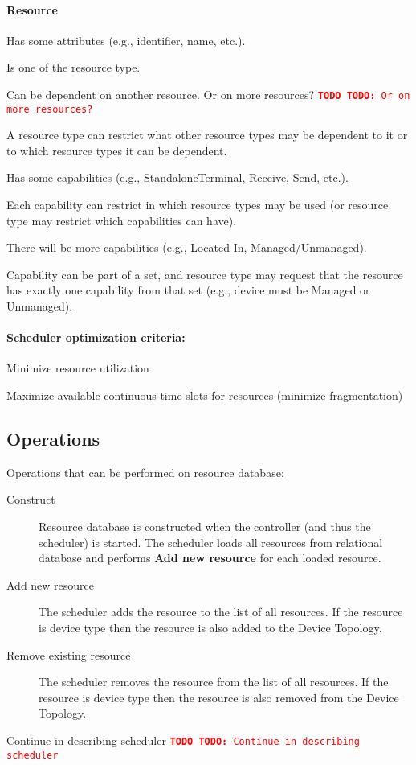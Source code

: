 \documentclass[a4paper]{report}
\newcommand{\TODO}[1]{%
\def\empty{}%
\def\prvniparametr{#1}%
\ifx\prvniparametr\empty%
\begingroup\tt\textcolor{red}{\noindent\textbf{TODO}}\endgroup
\else%
\begingroup\tt\textcolor{red}{\noindent\textbf{TODO:}\ #1}\endgroup
\fi%
}
\begin{document}
\paragraph{Resource}
\begin{compactitem}
\item Has some attributes (e.g., identifier, name, etc.).
\item Is one of the resource type.
\item Can be dependent on another resource. \TODO{Or on more resources?}
\item A resource type can restrict what other resource types may be dependent to it or to which resource types it can be dependent.
\item Has some capabilities (e.g., StandaloneTerminal, Receive, Send, etc.).
\item Each capability can restrict in which resource types may be used (or resource type may restrict which capabilities can have).
\item There will be more capabilities (e.g., Located In, Managed/Unmanaged).
\item Capability can be part of a set, and resource type may request that the resource has exactly one capability from that set (e.g., device must be Managed or Unmanaged). 
\end{compactitem}

\paragraph{Scheduler optimization criteria:}
\begin{compactitem}
\item Minimize resource utilization
\item Maximize available continuous time slots for resources (minimize fragmentation)
\end{compactitem}

\subsection{Operations}

Operations that can be performed on resource database:

\begin{description}
\item[Construct]
Resource database is constructed when the controller (and thus the scheduler) is started. The scheduler loads all resources from relational database and performs \textbf{Add new resource} for each loaded resource.

\item[Add new resource]
The scheduler adds the resource to the list of all resources. If the resource is device type then the resource is also added to the Device Topology.

\item[Remove existing resource]
The scheduler removes the resource from the list of all resources. If the resource is device type then the resource is also removed from the Device Topology.
\end{description}

\TODO{Continue in describing scheduler}
\end{document}
